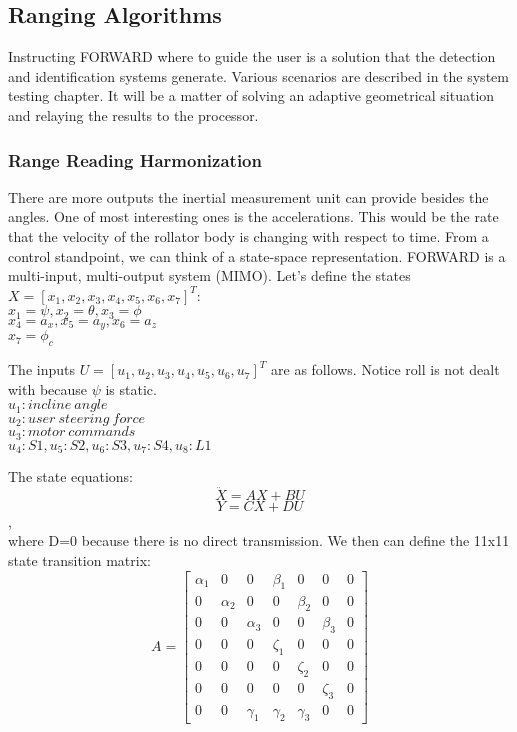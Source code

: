 \subsection{Ranging Algorithms}
\noindent Instructing FORWARD where to guide the user is a solution that the detection and identification systems generate. Various scenarios are described in the system testing chapter. It will be a matter of solving an adaptive geometrical situation and relaying the results to the processor.\\

\subsubsection{Range Reading Harmonization}
\noindent There are more outputs the inertial measurement unit can provide besides the angles. One of most interesting ones is the accelerations. This would be the rate that the velocity of the rollator body is changing with respect to time. From a control standpoint, we can think of a state-space representation. FORWARD is a multi-input, multi-output system (MIMO). Let's define the states $X = [x_1,x_2,x_3,x_4,x_5,x_6,x_7]^T$:\\
$x_1=\psi ,x_2=\theta, x_3=\phi$\\
$x_4=a_x, x_5=a_y, x_6=a_z$\\
$x_7=\phi_c$

\noindent The inputs $U = [u_1, u_2, u_3, u_4, u_5, u_6, u_7]^T$ are as follows. Notice roll is not dealt with because $\psi$ is static.\\
$u_1:incline\ angle$\\
$u_2:user\ steering\ force$\\
$u_3:motor\ commands$\\
$u_4:S1,u_5:S2,u_6:S3,u_7:S4,u_8:L1$

\noindent The state equations:\\
$$\ddot{X} = AX + BU$$
$$Y = CX + DU$$,\\
where D=0 because there is no direct transmission. We then can define the 11x11 state transition matrix:\\
\[A = \begin{bmatrix}
\alpha_1 & 0 & 0 & \beta_1 & 0 & 0 & 0 \\
0 & \alpha_2 & 0 & 0 & \beta_2 & 0 & 0 \\
0 & 0 & \alpha_3 & 0 & 0 & \beta_3 & 0 \\
0 & 0 & 0 & \zeta_1 & 0 & 0 & 0 \\
0 & 0 & 0 & 0 & \zeta_2 & 0 & 0 \\
0 & 0 & 0 & 0 & 0 & \zeta_3 & 0 \\
0 & 0 & \gamma_1 & \gamma_2 & \gamma_3 & 0 & 0
\end{bmatrix}\]

